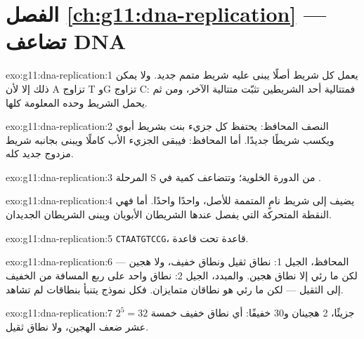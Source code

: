 \section*{الفصل \ref{ch:g11:dna-replication} --- تضاعف DNA}

\begin{solution}{exo:g11:dna-replication:1}
يعمل كل شريط أصلًا يبنى عليه شريط متمم جديد. ولا يمكن ذلك إلا لأن A
تزاوج T وG تزاوج C: فمتتالية أحد الشريطين تثبّت متتالية الآخر، ومن ثم
يحمل الشريط وحده المعلومة كلها.
\end{solution}

\begin{solution}{exo:g11:dna-replication:2}
النصف المحافظ: يحتفظ كل جزيء بنت بشريط أبوي ويكسب شريطًا جديدًا. أما
المحافظ: فيبقى الجزيء الأب كاملًا ويبنى بجانبه شريط مزدوج جديد كله.
\end{solution}

\begin{solution}{exo:g11:dna-replication:3}
المرحلة S من الدورة الخلوية؛ وتتضاعف كمية  في .
\end{solution}

\begin{solution}{exo:g11:dna-replication:4}
 يضيف إلى شريط نامٍ  المتممة للأصل، واحدًا
واحدًا. أما  فهي النقطة المتحركة التي يفصل عندها الشريطان
الأبويان ويبنى الشريطان الجديدان.
\end{solution}

\begin{solution}{exo:g11:dna-replication:5}
\texttt{CTAATGTCCG}، قاعدة تحت قاعدة.
\end{solution}

\begin{solution}{exo:g11:dna-replication:6}
المحافظ، الجيل 1: نطاق ثقيل ونطاق خفيف، ولا هجين --- لكن ما رئي إلا
نطاق هجين. والمبدد، الجيل 2: نطاق واحد على ربع المسافة من الخفيف إلى
الثقيل --- لكن ما رئي هو نطاقان متمايزان. فكل نموذج يتنبأ بنطاقات لم
تشاهد.
\end{solution}

\begin{solution}{exo:g11:dna-replication:7}
$2^5 = 32$ جزيئًا، 2 هجينان و30 خفيفًا: أي نطاق خفيف خمسة عشر ضعف
الهجين، ولا نطاق ثقيل.
\end{solution}

